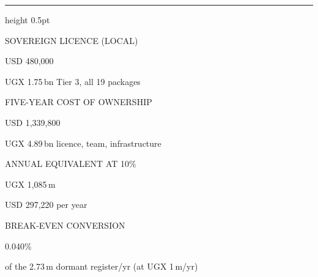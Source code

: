 \documentclass[10pt,a4paper]{article}
\begin{document}
\begin{titlepage}
\vfill
{\color{rulec}\hrule height 0.5pt}\vspace{5mm}
\noindent\begin{minipage}[t]{40mm}\RaggedRight
{\fontsize{6.2}{8}\selectfont\textcolor{inkiii}{SOVEREIGN LICENCE (LOCAL)}\par}\vspace{2.4mm}
{\datafont\fontsize{14}{14}\selectfont\textcolor{oxblood}{USD 480,000}\par}\vspace{2mm}
{\fontsize{7.6}{9.6}\selectfont\color{inkii}UGX 1.75\,bn \textperiodcentered{} Tier 3, all 19 packages\par}
\end{minipage}\hfill
\begin{minipage}[t]{43mm}\RaggedRight
{\fontsize{6.2}{8}\selectfont\textcolor{inkiii}{FIVE-YEAR COST OF OWNERSHIP}\par}\vspace{2.4mm}
{\datafont\fontsize{14}{14}\selectfont\textcolor{oxblood}{USD 1,339,800}\par}\vspace{2mm}
{\fontsize{7.6}{9.6}\selectfont\color{inkii}UGX 4.89\,bn \textperiodcentered{} licence, team, infrastructure\par}
\end{minipage}\hfill
\begin{minipage}[t]{38mm}\RaggedRight
{\fontsize{6.2}{8}\selectfont\textcolor{inkiii}{ANNUAL EQUIVALENT AT 10\%}\par}\vspace{2.4mm}
{\datafont\fontsize{14}{14}\selectfont\textcolor{ink}{UGX 1,085\,m}\par}\vspace{2mm}
{\fontsize{7.6}{9.6}\selectfont\color{inkii}USD 297,220 per year\par}
\end{minipage}\hfill
\begin{minipage}[t]{38mm}\RaggedRight
{\fontsize{6.2}{8}\selectfont\textcolor{inkiii}{BREAK-EVEN CONVERSION}\par}\vspace{2.4mm}
{\datafont\fontsize{14}{14}\selectfont\textcolor{ink}{0.040\%}\par}\vspace{2mm}
{\fontsize{7.6}{9.6}\selectfont\color{inkii}of the 2.73\,m dormant register/yr (at UGX 1\,m/yr)\par}
\end{minipage}


\end{titlepage}
\end{document}
